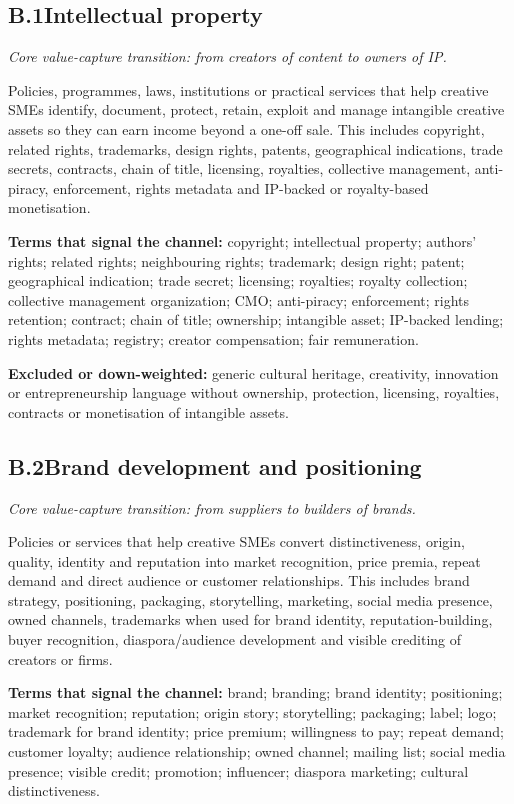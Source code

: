 \subsection*{B.1\quad Intellectual property}
\emph{Core value-capture transition: from creators of content to owners of IP.}

Policies, programmes, laws, institutions or practical services that help creative SMEs identify, document, protect, retain, exploit and manage intangible creative assets so they can earn income beyond a one-off sale. This includes copyright, related rights, trademarks, design rights, patents, geographical indications, trade secrets, contracts, chain of title, licensing, royalties, collective management, anti-piracy, enforcement, rights metadata and IP-backed or royalty-based monetisation.

\textbf{Terms that signal the channel:} copyright; intellectual property; authors' rights; related rights; neighbouring rights; trademark; design right; patent; geographical indication; trade secret; licensing; royalties; royalty collection; collective management organization; CMO; anti-piracy; enforcement; rights retention; contract; chain of title; ownership; intangible asset; IP-backed lending; rights metadata; registry; creator compensation; fair remuneration.

\textbf{Excluded or down-weighted:} generic cultural heritage, creativity, innovation or entrepreneurship language without ownership, protection, licensing, royalties, contracts or monetisation of intangible assets.

\subsection*{B.2\quad Brand development and positioning}
\emph{Core value-capture transition: from suppliers to builders of brands.}

Policies or services that help creative SMEs convert distinctiveness, origin, quality, identity and reputation into market recognition, price premia, repeat demand and direct audience or customer relationships. This includes brand strategy, positioning, packaging, storytelling, marketing, social media presence, owned channels, trademarks when used for brand identity, reputation-building, buyer recognition, diaspora/audience development and visible crediting of creators or firms.

\textbf{Terms that signal the channel:} brand; branding; brand identity; positioning; market recognition; reputation; origin story; storytelling; packaging; label; logo; trademark for brand identity; price premium; willingness to pay; repeat demand; customer loyalty; audience relationship; owned channel; mailing list; social media presence; visible credit; promotion; influencer; diaspora marketing; cultural distinctiveness.

